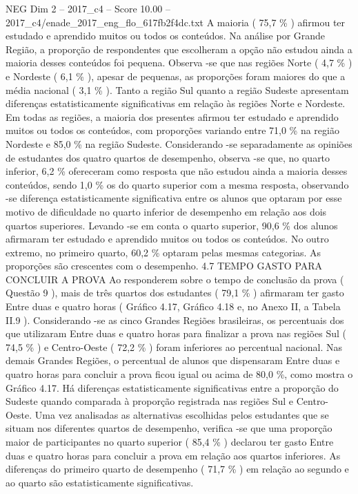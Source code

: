 \begin{textsample}{NEG Dim 2 – 2017\_c4 – Score 10.00 – 2017\_c4/enade\_2017\_eng\_flo\_617fb2f4dc.txt}
A maioria ( 75,7 \% ) afirmou ter estudado e aprendido muitos ou todos os conteúdos.
Na análise por Grande Região, a proporção de respondentes que escolheram a opção não estudou ainda a maioria desses conteúdos foi pequena.
Observa -se que nas regiões Norte ( 4,7 \% ) e Nordeste ( 6,1 \% ), apesar de pequenas, as proporções foram maiores do que a média nacional ( 3,1 \% ).
Tanto a região Sul quanto a região Sudeste apresentam diferenças estatisticamente significativas em relação às regiões Norte e Nordeste.
Em todas as regiões, a maioria dos presentes afirmou ter estudado e aprendido muitos ou todos os conteúdos, com proporções variando entre 71,0 \% na região Nordeste e 85,0 \% na região Sudeste.
Considerando -se separadamente as opiniões de estudantes dos quatro quartos de desempenho, observa -se que, no quarto inferior, 6,2 \% ofereceram como resposta que não estudou ainda a maioria desses conteúdos, sendo 1,0 \% os do quarto superior com a mesma resposta, observando -se diferença estatisticamente significativa entre os alunos que optaram por esse motivo de dificuldade no quarto inferior de desempenho em relação aos dois quartos superiores.
Levando -se em conta o quarto superior, 90,6 \% dos alunos afirmaram ter estudado e aprendido muitos ou todos os conteúdos.
No outro extremo, no primeiro quarto, 60,2 \% optaram pelas mesmas categorias.
As proporções são crescentes com o desempenho. 4.7 TEMPO GASTO PARA CONCLUIR A PROVA Ao responderem sobre o tempo de conclusão da prova ( Questão 9 ), mais de três quartos dos estudantes ( 79,1 \% ) afirmaram ter gasto Entre duas e quatro horas ( Gráfico 4.17, Gráfico 4.18 e, no Anexo II, a Tabela II.9 ).
Considerando -se as cinco Grandes Regiões brasileiras, os percentuais dos que utilizaram Entre duas e quatro horas para finalizar a prova nas regiões Sul ( 74,5 \% ) e Centro-Oeste ( 72,2 \% ) foram inferiores ao percentual nacional.
Nas demais Grandes Regiões, o percentual de alunos que dispensaram Entre duas e quatro horas para concluir a prova ficou igual ou acima de 80,0 \%, como mostra o Gráfico 4.17.
Há diferenças estatisticamente significativas entre a proporção do Sudeste quando comparada à proporção registrada nas regiões Sul e Centro-Oeste.
Uma vez analisadas as alternativas escolhidas pelos estudantes que se situam nos diferentes quartos de desempenho, verifica -se que uma proporção maior de participantes no quarto superior ( 85,4 \% ) declarou ter gasto Entre duas e quatro horas para concluir a prova em relação aos quartos inferiores.
As diferenças do primeiro quarto de desempenho ( 71,7 \% ) em relação ao segundo e ao quarto são estatisticamente significativas.

\end{textsample}
